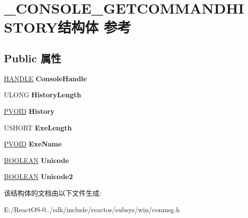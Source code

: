 \hypertarget{struct___c_o_n_s_o_l_e___g_e_t_c_o_m_m_a_n_d_h_i_s_t_o_r_y}{}\section{\+\_\+\+C\+O\+N\+S\+O\+L\+E\+\_\+\+G\+E\+T\+C\+O\+M\+M\+A\+N\+D\+H\+I\+S\+T\+O\+R\+Y结构体 参考}
\label{struct___c_o_n_s_o_l_e___g_e_t_c_o_m_m_a_n_d_h_i_s_t_o_r_y}
\subsection*{Public 属性}
\begin{DoxyCompactItemize}
\item 
\mbox{\label{struct___c_o_n_s_o_l_e___g_e_t_c_o_m_m_a_n_d_h_i_s_t_o_r_y_a075496fa218df0ed0d6dfd6363bf073f}} 
\hyperlink{interfacevoid}{H\+A\+N\+D\+LE} {\bfseries Console\+Handle}
\item 
\mbox{\label{struct___c_o_n_s_o_l_e___g_e_t_c_o_m_m_a_n_d_h_i_s_t_o_r_y_afbb5ab77d8c4565a3758ab2921d59607}} 
U\+L\+O\+NG {\bfseries History\+Length}
\item 
\mbox{\label{struct___c_o_n_s_o_l_e___g_e_t_c_o_m_m_a_n_d_h_i_s_t_o_r_y_a9a8763094af7c2f3584f3e13db2f07f1}} 
\hyperlink{interfacevoid}{P\+V\+O\+ID} {\bfseries History}
\item 
\mbox{\label{struct___c_o_n_s_o_l_e___g_e_t_c_o_m_m_a_n_d_h_i_s_t_o_r_y_a24d836b070ab137a80f0a081b4dc1b5e}} 
U\+S\+H\+O\+RT {\bfseries Exe\+Length}
\item 
\mbox{\label{struct___c_o_n_s_o_l_e___g_e_t_c_o_m_m_a_n_d_h_i_s_t_o_r_y_a3d8df230e9f4d131e0a7078b11be4518}} 
\hyperlink{interfacevoid}{P\+V\+O\+ID} {\bfseries Exe\+Name}
\item 
\mbox{\label{struct___c_o_n_s_o_l_e___g_e_t_c_o_m_m_a_n_d_h_i_s_t_o_r_y_a35ed3893d85c15d6631a74bebf1ce484}} 
\hyperlink{_processor_bind_8h_a112e3146cb38b6ee95e64d85842e380a}{B\+O\+O\+L\+E\+AN} {\bfseries Unicode}
\item 
\mbox{\label{struct___c_o_n_s_o_l_e___g_e_t_c_o_m_m_a_n_d_h_i_s_t_o_r_y_aa49aa2f914f04161f76df460769da713}} 
\hyperlink{_processor_bind_8h_a112e3146cb38b6ee95e64d85842e380a}{B\+O\+O\+L\+E\+AN} {\bfseries Unicode2}
\end{DoxyCompactItemize}


该结构体的文档由以下文件生成\+:\begin{DoxyCompactItemize}
\item 
E\+:/\+React\+O\+S-\/0../sdk/include/reactos/subsys/win/conmsg.\+h\end{DoxyCompactItemize}

